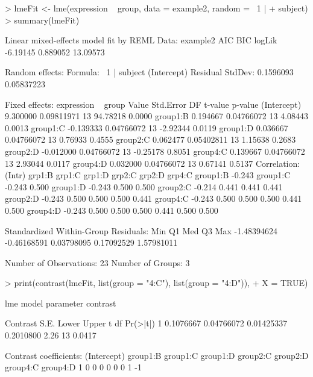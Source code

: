 \documentclass[12pt]{article}
\begin{document}
{\small
\begin{Schunk}
\begin{Sinput}
> lmeFit <- lme(expression ~ group, data = example2, random = ~1 | 
+     subject)
> summary(lmeFit)
\end{Sinput}
\begin{Soutput}
Linear mixed-effects model fit by REML
 Data: example2 
       AIC      BIC   logLik
  -6.19145 0.889052 13.09573

Random effects:
 Formula: ~1 | subject
        (Intercept)   Residual
StdDev:   0.1596093 0.05837223

Fixed effects: expression ~ group 
                Value  Std.Error DF  t-value p-value
(Intercept)  9.300000 0.09811971 13 94.78218  0.0000
group1:B     0.194667 0.04766072 13  4.08443  0.0013
group1:C    -0.139333 0.04766072 13 -2.92344  0.0119
group1:D     0.036667 0.04766072 13  0.76933  0.4555
group2:C     0.062477 0.05402811 13  1.15638  0.2683
group2:D    -0.012000 0.04766072 13 -0.25178  0.8051
group4:C     0.139667 0.04766072 13  2.93044  0.0117
group4:D     0.032000 0.04766072 13  0.67141  0.5137
 Correlation: 
         (Intr) grp1:B grp1:C grp1:D grp2:C grp2:D grp4:C
group1:B -0.243                                          
group1:C -0.243  0.500                                   
group1:D -0.243  0.500  0.500                            
group2:C -0.214  0.441  0.441  0.441                     
group2:D -0.243  0.500  0.500  0.500  0.441              
group4:C -0.243  0.500  0.500  0.500  0.441  0.500       
group4:D -0.243  0.500  0.500  0.500  0.441  0.500  0.500

Standardized Within-Group Residuals:
        Min          Q1         Med          Q3         Max 
-1.48394624 -0.46168591  0.03798095  0.17092529  1.57981011 

Number of Observations: 23
Number of Groups: 3 
\end{Soutput}
\begin{Sinput}
> print(contrast(lmeFit, list(group = "4:C"), list(group = "4:D")), 
+     X = TRUE)
\end{Sinput}
\begin{Soutput}
lme model parameter contrast

   Contrast       S.E.      Lower     Upper    t df Pr(>|t|)
1 0.1076667 0.04766072 0.01425337 0.2010800 2.26 13   0.0417

Contrast coefficients:
  (Intercept) group1:B group1:C group1:D group2:C group2:D group4:C group4:D
1           0        0        0        0        0        0        1       -1
\end{Soutput}
\end{Schunk}
}
\end{document}
